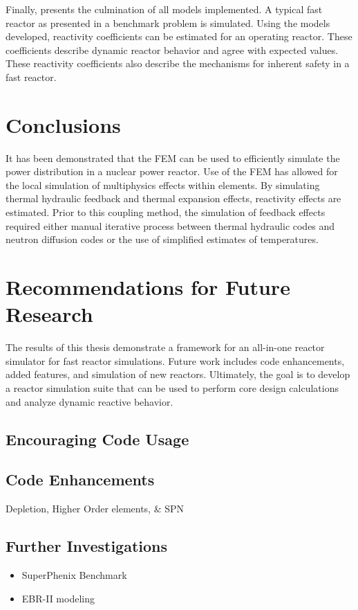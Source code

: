   Finally,  presents the culmination of all models
  implemented. A typical fast reactor as presented in a benchmark problem is 
  simulated.  Using the models developed, reactivity coefficients can be 
  estimated for an operating reactor. These coefficients describe dynamic 
  reactor behavior and agree with expected values. These reactivity coefficients 
  also describe the mechanisms for inherent safety in a fast reactor.

\section{Conclusions}
  
  It has been demonstrated that the FEM can be used to efficiently simulate the
  power distribution in a nuclear power reactor. Use of the FEM has allowed for 
  the local simulation of multiphysics effects within elements. By simulating
  thermal hydraulic feedback and thermal expansion effects, reactivity effects
  are estimated. Prior to this coupling method, the simulation of feedback
  effects required either manual iterative process between thermal hydraulic 
  codes and neutron diffusion codes or the use of simplified estimates of 
  temperatures. 
  
\section{Recommendations for Future Research}

  The results of this thesis demonstrate a framework for an all-in-one reactor 
  simulator for fast reactor simulations. Future work includes code 
  enhancements, added features, and simulation of new reactors. Ultimately, the 
  goal is to develop a reactor simulation suite that can be used to perform core 
  design calculations and analyze dynamic reactive behavior.

  \subsection{Encouraging Code Usage}
    

  \subsection{Code Enhancements}
    Depletion, Higher Order elements, \& SPN
 
  \subsection{Further Investigations}
    \begin{itemize}
      \item SuperPhenix Benchmark
      \item EBR-II modeling
    \end{itemize}

